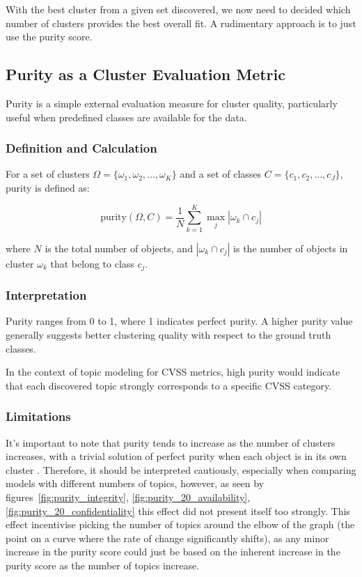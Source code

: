 \documentclass[12pt]{article}
\begin{document}
With the best cluster from a given set discovered, we now need to decided which number of clusters
provides the best overall fit. A rudimentary approach is to just use the purity score.

\subsection{Purity as a Cluster Evaluation Metric}\label{sec:purity}

Purity is a simple external evaluation measure for cluster quality, particularly useful when
predefined classes are available for the data.

\subsubsection*{Definition and Calculation}

For a set of clusters $\Omega = \{\omega_1, \omega_2, ..., \omega_K\}$ and a set of classes $C =
	\{c_1, c_2, ..., c_J\}$, purity is defined as:

\begin{equation}
	\text{purity}(\Omega, C) = \frac{1}{N} \sum_{k=1}^K \max_j |\omega_k \cap c_j|
\end{equation}

where $N$ is the total number of objects, and $|\omega_k \cap c_j|$ is the number of objects in
cluster $\omega_k$ that belong to class $c_j$.

\subsubsection*{Interpretation}

Purity ranges from 0 to 1, where 1 indicates perfect purity. A higher purity value generally
suggests better clustering quality with respect to the ground truth classes\cite{purity_info_ret}.

In the context of topic modeling for CVSS metrics, high purity would indicate that each discovered
topic strongly corresponds to a specific CVSS category.

\subsubsection*{Limitations}

It's important to note that purity tends to increase as the number of clusters increases, with a
trivial solution of perfect purity when each object is in its own cluster \cite{v-measure}.
Therefore, it should be interpreted cautiously, especially when comparing models with different
numbers of topics, however, as seen by figures~\ref{fig:purity_integrity},
\ref{fig:purity_20_availability}, \ref{fig:purity_20_confidentiality} this effect did not present
itself too strongly. This effect incentivise picking the number of topics around the elbow of the
graph (the point on a curve where the rate of change significantly shifts), as any minor increase in
the purity score could just be based on the inherent increase in the purity score as the number of
topics increase.
\end{document}
